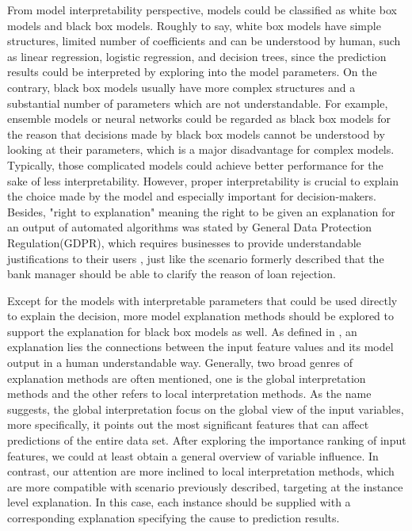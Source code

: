 From model interpretability perspective, models could be classified as white box models and black box models. Roughly to say, white box models have simple structures, limited number of coefficients and can be understood by human, such as linear regression, logistic regression, and decision trees, since the prediction results could be interpreted by exploring into the model parameters. On the contrary, black box models usually have more complex structures and a substantial number of parameters which are not understandable. For example, ensemble models or neural networks could be regarded as black box models for the reason that decisions made by black box models cannot be understood by looking at their parameters, which is a major disadvantage for complex models. Typically, those complicated models could achieve better performance for the sake of less interpretability. However, proper interpretability is crucial to explain the choice made by the model and especially important for decision-makers. Besides, "right to explanation" meaning the right to be given an explanation for an output of automated algorithms was stated by General Data Protection Regulation(GDPR), which requires businesses to provide understandable justifications to their users \cite{voigt2017eu}, just like the scenario formerly described that the bank manager should be able to clarify the reason of loan rejection. 

Except for the models with interpretable parameters that could be used directly to explain the decision, more model explanation methods should be explored to support the explanation for black box models as well. As defined in \cite{molnar2019}, an explanation lies the connections between the input feature values and its model output in a human understandable way. Generally, two broad genres of explanation methods are often mentioned, one is the global interpretation methods and the other refers to local interpretation methods. As the name suggests, the global interpretation focus on the global view of the input variables, more specifically, it points out the most significant features that can affect predictions of the entire data set. After exploring the importance ranking of input features, we could at least obtain a general overview of variable influence. In contrast, our attention are more inclined to local interpretation methods, which are more compatible with scenario previously described, targeting at the instance level explanation. In this case, each instance should be supplied with a corresponding explanation specifying the cause to prediction results. 

